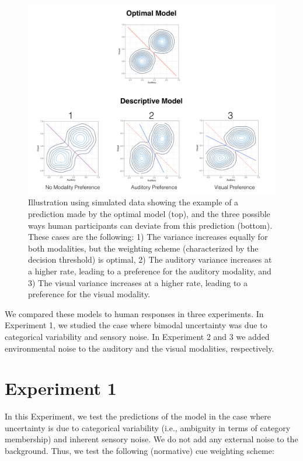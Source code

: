 \documentclass[english,,man,floatsintext]{apa6}
\theoremstyle{definition}
\theoremstyle{definition}
\theoremstyle{definition}
\theoremstyle{remark}
\begin{document}
\begin{figure}[!h]
\includegraphics[width=\textwidth]{pictures/sub-optimal} \caption{Illustration using simulated data showing the example of a prediction made by the optimal model (top), and the three possible ways human participants can deviate from this prediction (bottom). These cases are the following: 1) The variance increases equally for both modalities, but the weighting scheme (characterized by the decision threshold) is optimal, 2) The auditory variance increases at a higher rate, leading to a preference for the auditory modality, and 3) The visual variance increases at a higher rate, leading to a preference for the visual modality.}\label{fig:subOptim}
\end{figure}

We compared these models to human responses in three experiments. In
Experiment 1, we studied the case where bimodal uncertainty was due to
categorical variability and sensory noise. In Experiment 2 and 3 we
added environmental noise to the auditory and the visual modalities,
respectively.

\section{Experiment 1}\label{experiment-1}

In this Experiment, we test the predictions of the model in the case
where uncertainty is due to categorical variability (i.e., ambiguity in
terms of category membership) and inherent sensory noise. We do not add
any external noise to the background. Thus, we test the following
(normative) cue weighting scheme:
\end{document}
